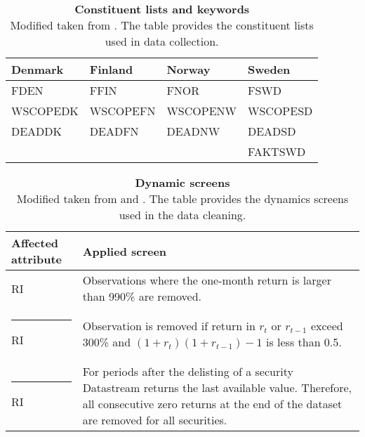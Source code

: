 \documentclass[12pt]{article}
\begin{document}
\begin{appendices}
\begin{table}[H] 
\footnotesize
\caption[Constituent lists and keywords]{\textbf{Constituent lists and keywords}\\ Modified taken from \protect\citet{HANAUER2023106712}. The table provides the constituent lists used in data collection.\footnotemark} 
 \label{table:constituteLists}
\centering
\begin{tabularx}{\textwidth}{X X X X}
\toprule
Denmark & Finland & Norway & Sweden \\
\midrule
FDEN 		&  FFIN		& FNOR		& FSWD\\
WSCOPEDK & WSCOPEFN & WSCOPENW& WSCOPESD\\
DEADDK 	&   DEADFN 	& DEADNW 	& DEADSD\\
& & & FAKTSWD\\
 \bottomrule
 \end{tabularx}
 \end{table} 
 
 
\begin{table}[H] 
\footnotesize
\caption[Dynamic screens]{\textbf{Dynamic screens}\\ Modified taken from \protect\citet{Ince2006} and \protect\citet{HANAUER2023106712}. The table provides the dynamics screens used in the data cleaning.\footnotemark}
 \label{table:DynamicScreens}
\centering
\begin{tabularx}{\textwidth}{l X}
\toprule
Affected attribute & Applied screen \\
\midrule
RI 		& Observations where the one-month return is larger than 990\% are removed.\\ \rule{-1ex}{3ex}
RI		& Observation is removed if return in $r_t$ or $r_{t-1}$ exceed 300\% and $(1+r_{t})(1+r_{t-1}) -1$ is less than 0.5. \\ \rule{-1ex}{3ex}
RI 		& For periods after the delisting of a security Datastream returns the last available value. Therefore, all consecutive zero returns at the end of the dataset are removed for all securities.\\
 \bottomrule
 \end{tabularx}
 \end{table} 


\end{appendices}
\end{document}
